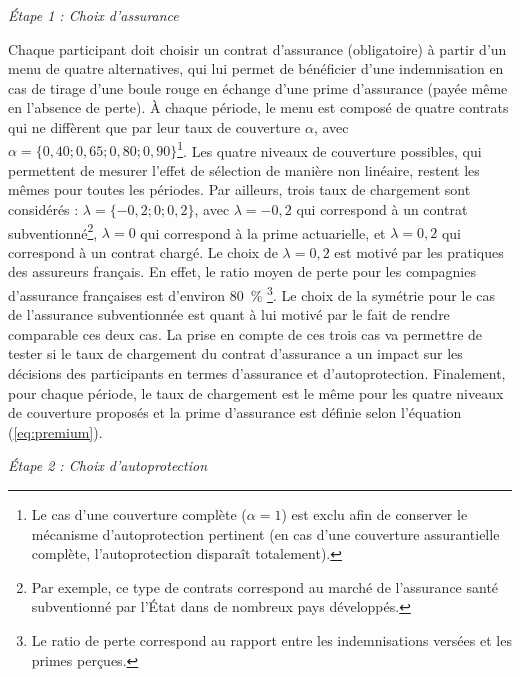 \begin{Article}
\begin{refsection}[Mouminoux]
\vspace{0,3cm}
\textit{Étape 1 : Choix d'assurance}

\vspace{0,2cm}
Chaque participant doit choisir un contrat d'assurance (obligatoire) à partir d'un menu de quatre alternatives, qui lui permet de bénéficier d'une indemnisation en cas de tirage d'une boule rouge en échange d'une prime d'assurance (payée même en l'absence de perte). À chaque période, le menu est composé de quatre contrats qui ne diffèrent que par leur taux de couverture $\alpha$, avec $\alpha = \{0,40;0,65;0,80;0,90\}$\footnote{Le cas d'une couverture complète ($\alpha = 1$) est exclu afin de conserver le mécanisme d'autoprotection pertinent (en cas d'une couverture assurantielle complète, l'autoprotection disparaît totalement).}. Les quatre niveaux de couverture possibles, qui permettent de mesurer l'effet de sélection de manière non linéaire, restent les mêmes pour toutes les périodes. Par ailleurs, trois taux de chargement sont considérés : $\lambda = \{-0,2;0;0,2\}$, avec $\lambda=-0,2$ qui correspond à un contrat subventionné\footnote{Par exemple, ce type de contrats correspond au marché de l'assurance santé subventionné par l'État dans de nombreux pays développés.}, $\lambda = 0$ qui correspond à la prime actuarielle, et $\lambda = 0,2$ qui correspond à un contrat chargé.  Le choix de $\lambda = 0,2$ est motivé par les pratiques des assureurs français. En effet, le ratio moyen de perte pour les compagnies d'assurance françaises est d'environ 80~\% \parencite{fa22}\footnote{Le ratio de perte correspond au rapport entre les indemnisations versées et les primes perçues.}. Le choix de la symétrie pour le cas de l'assurance subventionnée est quant à lui motivé par le fait de rendre comparable ces deux cas. La prise en compte de ces trois cas va permettre de tester si le taux de chargement du contrat d'assurance a un impact sur les décisions des participants en termes d'assurance et d'autoprotection. Finalement, pour chaque période, le taux de chargement est le même pour les quatre niveaux de couverture proposés et la prime d'assurance est définie selon l'équation (\ref{eq:premium}).

\newpage
\textit{Étape 2 : Choix d'autoprotection}


\end{refsection}
\end{Article}
